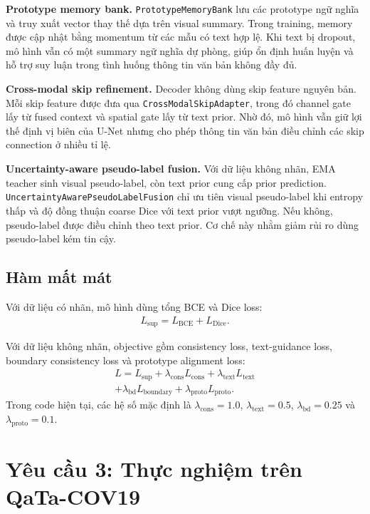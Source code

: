 \textbf{Prototype memory bank.} \texttt{PrototypeMemoryBank} lưu các prototype ngữ nghĩa và truy xuất vector thay thế dựa trên visual summary. Trong training, memory được cập nhật bằng momentum từ các mẫu có text hợp lệ. Khi text bị dropout, mô hình vẫn có một summary ngữ nghĩa dự phòng, giúp ổn định huấn luyện và hỗ trợ suy luận trong tình huống thông tin văn bản không đầy đủ.

\textbf{Cross-modal skip refinement.} Decoder không dùng skip feature nguyên bản. Mỗi skip feature được đưa qua \texttt{CrossModalSkipAdapter}, trong đó channel gate lấy từ fused context và spatial gate lấy từ text prior. Nhờ đó, mô hình vẫn giữ lợi thế định vị biên của U-Net nhưng cho phép thông tin văn bản điều chỉnh các skip connection ở nhiều tỉ lệ.

\textbf{Uncertainty-aware pseudo-label fusion.} Với dữ liệu không nhãn, EMA teacher sinh visual pseudo-label, còn text prior cung cấp prior prediction. \texttt{UncertaintyAwarePseudoLabelFusion} chỉ ưu tiên visual pseudo-label khi entropy thấp và độ đồng thuận coarse Dice với text prior vượt ngưỡng. Nếu không, pseudo-label được điều chỉnh theo text prior. Cơ chế này nhằm giảm rủi ro dùng pseudo-label kém tin cậy.

\subsection{Hàm mất mát}

Với dữ liệu có nhãn, mô hình dùng tổng BCE và Dice loss:
\begin{align}
  L_{\mathrm{sup}} = L_{\mathrm{BCE}} + L_{\mathrm{Dice}}.
\end{align}

Với dữ liệu không nhãn, objective gồm consistency loss, text-guidance loss, boundary consistency loss và prototype alignment loss:
\[
\begin{aligned}
  L = L_{\mathrm{sup}}
  + \lambda_{\mathrm{cons}} L_{\mathrm{cons}}
  + \lambda_{\mathrm{text}} L_{\mathrm{text}} \\
  + \lambda_{\mathrm{bd}} L_{\mathrm{boundary}}
  + \lambda_{\mathrm{proto}} L_{\mathrm{proto}}.
\end{aligned}
\]
Trong code hiện tại, các hệ số mặc định là $\lambda_{\mathrm{cons}}=1.0$, $\lambda_{\mathrm{text}}=0.5$, $\lambda_{\mathrm{bd}}=0.25$ và $\lambda_{\mathrm{proto}}=0.1$.

\section{Yêu cầu 3: Thực nghiệm trên QaTa-COV19}

